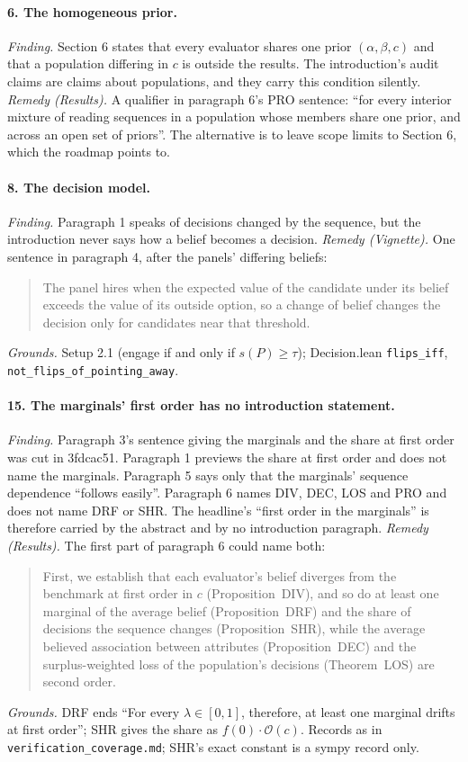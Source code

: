 \documentclass[11pt,a4paper]{article}
\begin{document}
\paragraph{6. The homogeneous prior.}
\emph{Finding.} Section 6 states that every evaluator shares one prior $(\alpha,\beta,c)$ and that a
population differing in $c$ is outside the results. The introduction's audit claims are claims
about populations, and they carry this condition silently.
\emph{Remedy (Results).} A qualifier in paragraph 6's PRO sentence: ``for every interior mixture of
reading sequences in a population whose members share one prior, and across an open set of
priors''. The alternative is to leave scope limits to Section 6, which the roadmap points to.

\paragraph{8. The decision model.}
\emph{Finding.} Paragraph 1 speaks of decisions changed by the sequence, but the introduction
never says how a belief becomes a decision.
\emph{Remedy (Vignette).} One sentence in paragraph 4, after the panels' differing beliefs:
\begin{quote}
The panel hires when the expected value of the candidate under its belief exceeds the value of
its outside option, so a change of belief changes the decision only for candidates near that
threshold.
\end{quote}
\emph{Grounds.} Setup 2.1 (engage if and only if $s(P)\ge\tau$); Decision.lean \texttt{flips\_iff},
\texttt{not\_flips\_of\_pointing\_away}.

\paragraph{15. The marginals' first order has no introduction statement.}
\emph{Finding.} Paragraph 3's sentence giving the marginals and the share at first order was cut
in 3fdcac51. Paragraph 1 previews the share at first order and does not name the marginals.
Paragraph 5 says only that the marginals' sequence dependence ``follows easily''. Paragraph 6
names DIV, DEC, LOS and PRO and does not name DRF or SHR. The headline's ``first order in the
marginals'' is therefore carried by the abstract and by no introduction paragraph.
\emph{Remedy (Results).} The first part of paragraph 6 could name both:
\begin{quote}
First, we establish that each evaluator's belief diverges from the benchmark at first order in
$c$ (Proposition~DIV), and so do at least one marginal of the average belief
(Proposition~DRF) and the share of decisions the sequence changes (Proposition~SHR), while the
average believed association between attributes (Proposition~DEC) and the surplus-weighted loss
of the population's decisions (Theorem~LOS) are second order.
\end{quote}
\emph{Grounds.} DRF ends ``For every $\lambda\in[0,1]$, therefore, at least one marginal drifts at
first order''; SHR gives the share as $f(0)\cdot\mathcal{O}(c)$. Records as in
\texttt{verification\_coverage.md}; SHR's exact constant is a sympy record only.
\end{document}
